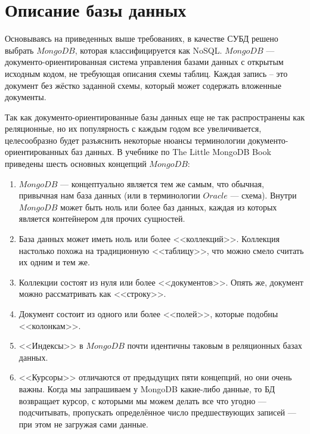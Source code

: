 \documentclass[14pt]{extreport}
\begin{document}
\section{Описание базы данных}

Основываясь на приведенных выше требованиях, в качестве СУБД решено выбрать $MongoDB$, которая классифицируется как NoSQL. $MongoDB$ — документо-ориентированная система управления базами данных с открытым исходным кодом, не требующая описания схемы таблиц. Каждая запись – это документ без жёстко заданной схемы, который может содержать вложенные документы.

Так как документо-ориентированные базы данных еще не так распространены как реляционные, но их популярность с каждым годом все увеличивается, целесообразно будет разъяснить некоторые нюансы терминологии документо-ориентированных баз данных. В учебнике по The Little MongoDB Book\cite{bib:mongo} приведены шесть основных концепций $MongoDB$:

\begin{enumerate}

\item $MongoDB$ — концептуально является тем же самым, что обычная, привычная нам база данных (или в терминологии $Oracle$ — схема). Внутри $MongoDB$ может быть ноль или более баз данных, каждая из которых является контейнером для прочих сущностей.

\item База данных может иметь ноль или более <<коллекций>>. Коллекция настолько похожа на традиционную <<таблицу>>, что можно смело считать их одним и тем же.

\item Коллекции состоят из нуля или более <<документов>>. Опять же, документ можно рассматривать как <<строку>>.

\item Документ состоит из одного или более <<полей>>, которые подобны <<колонкам>>.

\item <<Индексы>> в $MongoDB$ почти идентичны таковым в реляционных базах данных.

\item <<Курсоры>> отличаются от предыдущих пяти концепций, но они очень важны. Когда мы запрашиваем у MongoDB какие-либо данные, то БД возвращает курсор, с которыми мы можем делать все что угодно — подсчитывать, пропускать определённое число предшествующих записей — при этом не загружая сами данные.

\end{enumerate}
\end{document}
